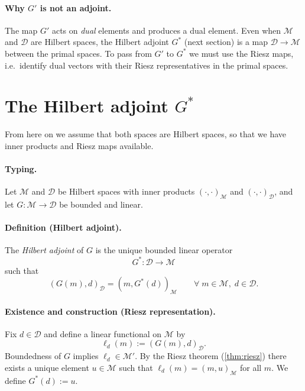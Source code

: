 \documentclass[11pt,twoside,openright]{book}
\theoremstyle{plain}
\theoremstyle{definition}
\theoremstyle{remark}
\newcommand{\modelspace}{\mathcal{M}}
\newcommand{\dataspace}{\mathcal{D}}
\newcommand{\ipM}[2]{(#1,#2)_{\modelspace}}
\newcommand{\ipD}[2]{(#1,#2)_{\dataspace}}
\begin{document}
\paragraph{Why $G'$ is not an adjoint.}
The map $G'$ acts on \emph{dual} elements and produces a dual element.
Even when $\modelspace$ and $\dataspace$ are Hilbert spaces, the Hilbert adjoint
$G^*$ (next section) is a map $\dataspace \to \modelspace$ between the primal
spaces. To pass from $G'$ to $G^*$ we must use the Riesz maps, i.e.\ identify
dual vectors with their Riesz representatives in the primal spaces.

\section{The Hilbert adjoint $G^*$}
\label{sec:hilbert-adjoint}

From here on we assume that both spaces are Hilbert spaces, so that we have
inner products and Riesz maps available.

\paragraph{Typing.}
Let $\modelspace$ and $\dataspace$ be Hilbert spaces with inner products
$\ipM{\cdot}{\cdot}$ and $\ipD{\cdot}{\cdot}$, and let
$G : \modelspace \to \dataspace$ be bounded and linear.

\paragraph{Definition (Hilbert adjoint).}
The \emph{Hilbert adjoint} of $G$ is the unique bounded linear operator
\begin{equation}
  \label{eq:hilbert-adjoint-typing}
  G^* : \dataspace \to \modelspace
\end{equation}
such that
\begin{equation}
  \label{eq:hilbert-adjoint-def}
  \ipD{G(m)}{d} = \ipM{m}{G^*(d)}
  \qquad \forall\; m\in\modelspace,\; d\in\dataspace.
\end{equation}

\paragraph{Existence and construction (Riesz representation).}
Fix $d\in\dataspace$ and define a linear functional on $\modelspace$ by
\begin{equation}
  \label{eq:adjoint-functional}
  \ell_d(m) := \ipD{G(m)}{d}.
\end{equation}
Boundedness of $G$ implies $\ell_d\in\modelspace'$. By the Riesz theorem
(\cref{thm:riesz}) there exists a unique element $u\in\modelspace$ such that
$\ell_d(m)=\ipM{m}{u}$ for all $m$. We define $G^*(d):=u$.
\end{document}
